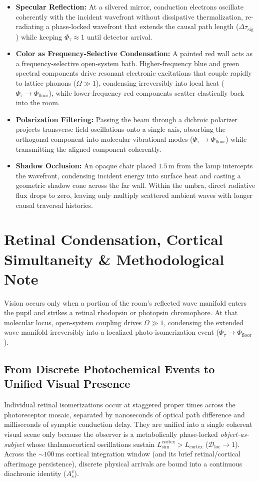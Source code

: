 \documentclass[11pt,a4paper]{article}
\begin{document}
\begin{itemize}
    \item \textbf{Specular Reflection:} At a silvered mirror, conduction electrons oscillate coherently with the incident wavefront without dissipative thermalization, re-radiating a phase-locked wavefront that extends the causal path length ($\Delta\tau_{\mathrm{sig}}$) while keeping $\Phi_\tau \approx 1$ until detector arrival.
    \item \textbf{Color as Frequency-Selective Condensation:} A painted red wall acts as a frequency-selective open-system bath. Higher-frequency blue and green spectral components drive resonant electronic excitations that couple rapidly to lattice phonons ($\Omega \gg 1$), condensing irreversibly into local heat ($\Phi_\tau \to \Phi_{\mathrm{floor}}$), while lower-frequency red components scatter elastically back into the room.
    \item \textbf{Polarization Filtering:} Passing the beam through a dichroic polarizer projects transverse field oscillations onto a single axis, absorbing the orthogonal component into molecular vibrational modes ($\Phi_\tau \to \Phi_{\mathrm{floor}}$) while transmitting the aligned component coherently.
    \item \textbf{Shadow Occlusion:} An opaque chair placed $1.5\,\mathrm{m}$ from the lamp intercepts the wavefront, condensing incident energy into surface heat and casting a geometric shadow cone across the far wall. Within the umbra, direct radiative flux drops to zero, leaving only multiply scattered ambient waves with longer causal traversal histories.
\end{itemize}

\section{Retinal Condensation, Cortical Simultaneity \& Methodological Note}

Vision occurs only when a portion of the room's reflected wave manifold enters the pupil and strikes a retinal rhodopsin or photopsin chromophore. At that molecular locus, open-system coupling drives $\Omega \gg 1$, condensing the extended wave manifold irreversibly into a localized photo-isomerization event ($\Phi_\tau \to \Phi_{\mathrm{floor}}$).

\subsection{From Discrete Photochemical Events to Unified Visual Presence}
Individual retinal isomerizations occur at staggered proper times across the photoreceptor mosaic, separated by nanoseconds of optical path difference and milliseconds of synaptic conduction delay. They are unified into a single coherent visual scene only because the observer is a metabolically phase-locked \emph{object-as-subject} whose thalamocortical oscillations sustain $L_{\mathrm{sim}}^{\mathrm{cortex}} > L_{\mathrm{cortex}}$ ($\mathcal{D}_{\mathrm{loc}} \to 1$). Across the $\sim 100\,\mathrm{ms}$ cortical integration window (and its brief retinal/cortical afterimage persistence), discrete physical arrivals are bound into a continuous diachronic identity ($A_s^v$).
\end{document}
